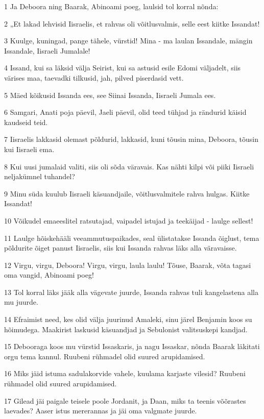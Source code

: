 \par 1 Ja Deboora ning Baarak, Abinoami poeg, laulsid tol korral nõnda:
\par 2 „Et lakad lehvisid Iisraelis, et rahvas oli võitlusvalmis, selle eest kiitke Issandat!
\par 3 Kuulge, kuningad, pange tähele, vürstid! Mina - ma laulan Issandale, mängin Issandale, Iisraeli Jumalale!
\par 4 Issand, kui sa läksid välja Seirist, kui sa astusid esile Edomi väljadelt, siis värises maa, taevadki tilkusid, jah, pilved piserdasid vett.
\par 5 Mäed kõikusid Issanda ees, see Siinai Issanda, Iisraeli Jumala ees.
\par 6 Samgari, Anati poja päevil, Jaeli päevil, olid teed tühjad ja rändurid käisid kaudseid teid.
\par 7 Iisraelis lakkasid olemast põldurid, lakkasid, kuni tõusin mina, Deboora, tõusin kui Iisraeli ema.
\par 8 Kui uusi jumalaid valiti, siis oli sõda väravais. Kas nähti kilpi või piiki Iisraeli neljakümnel tuhandel?
\par 9 Minu süda kuulub Iisraeli käsuandjaile, võitlusvalmitele rahva hulgas. Kiitke Issandat!
\par 10 Võikudel emaeeslitel ratsutajad, vaipadel istujad ja teekäijad - laulge sellest!
\par 11 Laulge hõiskehääli veeammutuspaikades, seal ülistatakse Issanda õiglust, tema põldurite õiget panust Iisraelis, siis kui Issanda rahvas läks alla väravaisse.
\par 12 Virgu, virgu, Deboora! Virgu, virgu, laula laulu! Tõuse, Baarak, võta tagasi oma vangid, Abinoami poeg!
\par 13 Tol korral läks jääk alla vägevate juurde, Issanda rahvas tuli kangelastena alla mu juurde.
\par 14 Efraimist need, kes olid välja juurinud Amaleki, sinu järel Benjamin koos su hõimudega. Maakirist laskusid käsuandjad ja Sebulonist valitsuskepi kandjad.
\par 15 Debooraga koos mu vürstid Issaskaris, ja nagu Issaskar, nõnda Baarak läkitati orgu tema kannul. Ruubeni rühmadel olid suured arupidamised.
\par 16 Miks jäid istuma sadulakorvide vahele, kuulama karjaste vilesid? Ruubeni rühmadel olid suured arupidamised.
\par 17 Gilead jäi paigale teisele poole Jordanit, ja Daan, miks ta teenis võõrastes laevades? Aaser istus mererannas ja jäi oma valgmate juurde.
